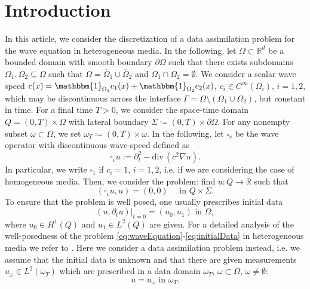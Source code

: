 \documentclass[sn-mathphys-num]{sn-jnl}
\numberwithin{equation}{section}
\renewcommand{\div}{\mathrm{div}\,}  %
\newcommand{\wop}{\square_c}
\newcommand{\dt}{\partial_t}
\begin{document}
\section{Introduction}
\noindent In this article, we consider the discretization of a data assimilation problem for the wave equation in heterogeneous media. In the following, let $\Omega \subset \mathbb{R}^d$ be a bounded domain with smooth boundary $\partial \Omega$ such that there exists subdomains $\Omega_1, \Omega_2 \subseteq \Omega$ such that $\Omega = \overline{\Omega}_1 \cup \overline{\Omega}_2$ and $\Omega_1 \cap \Omega_2 = \emptyset$. We consider a scalar wave speed $c(x) = \mathbbm{1}_{\Omega_1} c_1(x) + \mathbbm{1}_{\Omega_2} c_2(x)$, $c_i \in C^\infty(\Omega_i)$, $i = 1,2$, which may be discontinuous across the interface $\Gamma = \Omega \setminus (\Omega_1 \cup \Omega_2)$, but constant in time. For a final time $T > 0$, we consider the space-time domain $Q = (0,T) \times \Omega$ with lateral boundary $\Sigma \coloneqq (0,T) \times \partial \Omega$. For any nonempty subset $\omega \subset \Omega$, we set $\omega_T \coloneqq (0,T) \times \omega$. In the following, let $\wop$ be the wave operator with discontinuous wave-speed defined as 
\begin{equation*}
    \wop u := \partial_t^2 - \div(c^2 \nabla u).
\end{equation*}
In particular, we write $\square_1$ if $c_i = 1$, $i = 1,2$, i.e. if we are considering the case of homogeneous media. 
Then, we consider the problem: find $u : Q \rightarrow \mathbb{R}$ such that 
\begin{equation}\label{eq:waveEquation}
        (\wop u, u) = (0,0) \quad \text{ in } Q \times \Sigma.  
\end{equation}
To ensure that the problem is well posed, one usually prescribes initial data
\begin{equation}\label{eq:initialData}
    (u,\dt u) \vert_{t = 0} = (u_0,u_1) \text{ in } \Omega, \tag{IVP} 
\end{equation}
where $u_0 \in H^1(Q)$ and $u_1 \in L^2(Q)$ are given. For a detailed analysis of the well-posedness of the problem \eqref{eq:waveEquation}-\eqref{eq:initialData} in heterogeneous media we refer to \cite{StolkPhD}. 
Here we consider a data assimilation problem instead, i.e. we assume that the initial data is unknown and that there are given measurements $u_{\omega} \in L^2(\omega_T)$ which are prescribed in a data domain $\omega_T$, $\omega \subset \Omega$, $\omega \not = \emptyset$:
\begin{equation}\label{eq:dataMatch}
    u = u_{\omega} \text{ in } \omega_T. \tag{DA}
\end{equation}
\end{document}
